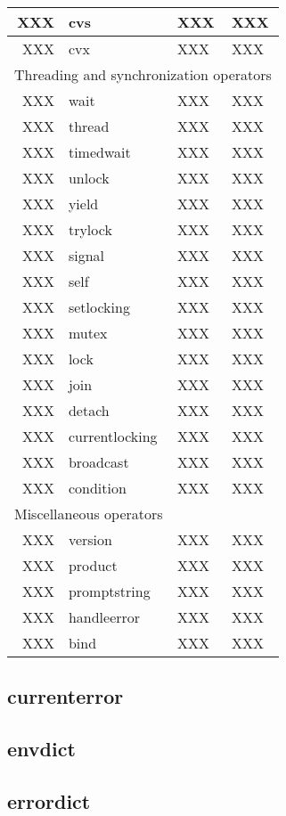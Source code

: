 \begin{longtable}{|r|l|l|p{4in}|}
\hline
XXX & cvs & XXX & XXX \\
\hline
XXX & cvx & XXX & XXX \\
\hline \hline
\multicolumn{4}{|l|}{Threading and synchronization operators} \\
\hline \hline
XXX & wait & XXX & XXX \\
\hline
XXX & thread & XXX & XXX \\
\hline
XXX & timedwait & XXX & XXX \\
\hline
XXX & unlock & XXX & XXX \\
\hline
XXX & yield & XXX & XXX \\
\hline
XXX & trylock & XXX & XXX \\
\hline
XXX & signal & XXX & XXX \\
\hline
XXX & self & XXX & XXX \\
\hline
XXX & setlocking & XXX & XXX \\
\hline
XXX & mutex & XXX & XXX \\
\hline
XXX & lock & XXX & XXX \\
\hline
XXX & join & XXX & XXX \\
\hline
XXX & detach & XXX & XXX \\
\hline
XXX & currentlocking & XXX & XXX \\
\hline
XXX & broadcast & XXX & XXX \\
\hline
XXX & condition & XXX & XXX \\
\hline \hline
\multicolumn{4}{|l|}{Miscellaneous operators} \\
\hline \hline
XXX & version & XXX & XXX \\
\hline
XXX & product & XXX & XXX \\
\hline
XXX & promptstring & XXX & XXX \\
\hline
XXX & handleerror & XXX & XXX \\
\hline
XXX & bind & XXX & XXX \\
\end{longtable}

\subsection{currenterror}
\subsection{envdict}
\subsection{errordict}
